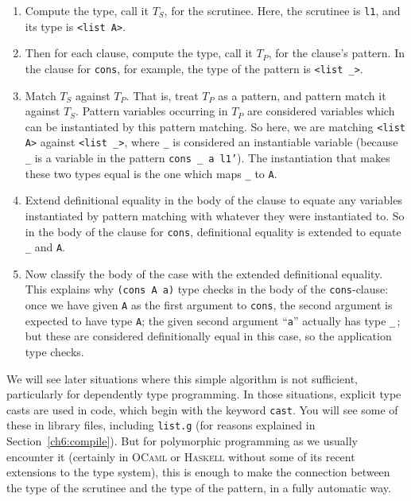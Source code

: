 \documentclass{book}[12pt]
\begin{document}
\begin{enumerate}
\item Compute the type, call it $T_S$, for the scrutinee.  Here, the
scrutinee is \texttt{l1}, and its type is \texttt{<list A>}.
\item Then for each clause, compute the type, call it $T_P$, for the
clause's pattern.  In the clause for \texttt{cons}, for example, the
type of the pattern is \texttt{<list \_>}.
\item Match $T_S$ against $T_P$.  That is, treat $T_P$ as a pattern,
and pattern match it against $T_S$.  Pattern variables occurring in
$T_P$ are considered variables which can be instantiated by this
pattern matching.  So here, we are matching \texttt{<list A>} against
\texttt{<list \_>}, where \texttt{\_} is considered an instantiable
variable (because \texttt{\_} is a variable in the pattern
\texttt{cons \_ a l1'}).  The instantiation that makes these two types
equal is the one which maps \texttt{\_} to \texttt{A}.
\item Extend definitional equality in the body of the clause to equate
any variables instantiated by pattern matching with whatever they were
instantiated to.  So in the body of the clause for \texttt{cons}, definitional
equality is extended to equate \texttt{\_} and \texttt{A}.
\item Now classify the body of the case with the extended definitional
equality.  This explains why \texttt{(cons A a)} type checks in the
body of the \texttt{cons}-clause: once we have given \texttt{A} as the
first argument to \texttt{cons}, the second argument is expected to have
type \texttt{A}; the given second argument ``\texttt{a}'' actually has
type \texttt{\_}\,; but these are considered definitionally equal in this
case, so the application type checks.
\end{enumerate}

We will see later situations where this simple algorithm is not
sufficient, particularly for dependently type programming.  In those
situations, explicit type casts are used in code, which begin with the
keyword \texttt{cast}.  You will see some of these in library files,
including \texttt{list.g} (for reasons explained in
Section~\ref{ch6:compile}).  But for polymorphic programming as we
usually encounter it (certainly in \textsc{OCaml} or \textsc{Haskell}
without some of its recent extensions to the type system), this is
enough to make the connection between the type of the scrutinee and
the type of the pattern, in a fully automatic way.
\end{document}

